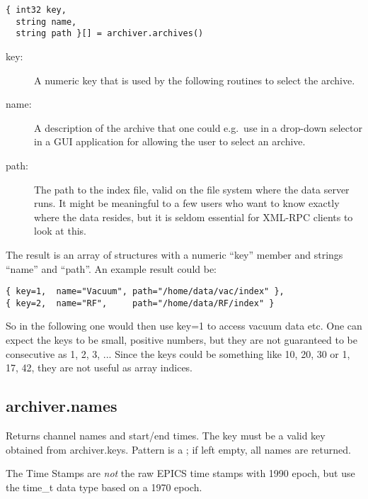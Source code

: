 \begin{lstlisting}[keywordstyle=\sffamily]
{ int32 key, 
  string name, 
  string path }[] = archiver.archives()
\end{lstlisting}

\begin{description}
\item[\sffamily key:] A numeric key that is used by the following
                      routines to select the archive.
\item[\sffamily name:] A description of the archive that one could
                       e.g.\ use in a drop-down selector in a GUI
                       application for allowing the user to select an archive.
\item[\sffamily path:] The path to the index file,  valid on the file
                       system where the data server runs.
                       It might be meaningful to a few users who want to
                       know exactly where the data resides,  but it is
                       seldom essential for XML-RPC clients to look at this.
\end{description}

\noindent The result is an array of structures with a numeric ``key''
member and strings ``name'' and ``path''.
An example result could be:
\begin{lstlisting}[keywordstyle=\sffamily]
{ key=1,  name="Vacuum", path="/home/data/vac/index" },
{ key=2,  name="RF",     path="/home/data/RF/index" }
\end{lstlisting}

\noindent So in the following one would then use key=1 to access
vacuum data etc. One can expect the keys to be small,  positive
numbers,  but they are not guaranteed to be consecutive as 1, 2, 3,
... Since the keys could be something like 10,  20, 30 or 1, 17, 42,
they are not useful as array indices.

\subsection{archiver.names} %
Returns channel names and start/end times.
The key must be a valid key obtained from archiver.keys.
Pattern is a ;
if left empty,  all names are returned.

\NOTE The Time Stamps are \emph{not} the raw EPICS time stamps with 1990 epoch, 
but use the time\_t data type based on a 1970 epoch.


